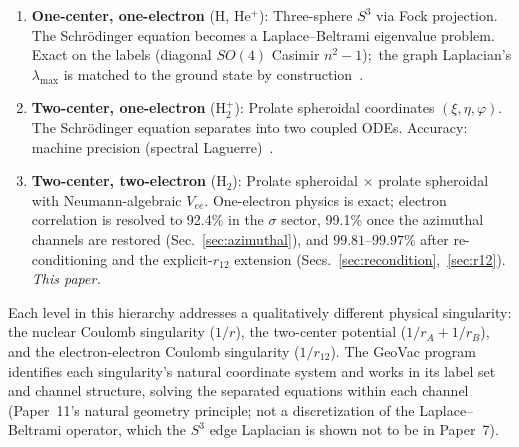 \documentclass[aps,pra,twocolumn,superscriptaddress,longbibliography]{revtex4-2}
\begin{document}
\begin{enumerate}
  \item \textbf{One-center, one-electron} (H, He$^+$):
    Three-sphere $S^3$ via Fock projection.  The Schr\"odinger
    equation becomes a Laplace--Beltrami eigenvalue problem.
    Exact on the labels (diagonal $SO(4)$ Casimir $n^2-1$);\ the graph
    Laplacian's $\lambda_{\max}$ is matched to the ground state by
    construction~\cite{loutey_paper0, loutey_paper1}.
  \item \textbf{Two-center, one-electron} (H$_2^+$):
    Prolate spheroidal coordinates $(\xi, \eta, \varphi)$.
    The Schr\"odinger equation separates into two coupled ODEs.
    Accuracy: machine precision (spectral Laguerre)~\cite{loutey_paper11}.
  \item \textbf{Two-center, two-electron} (H$_2$):
    Prolate spheroidal $\times$ prolate spheroidal with
    Neumann-algebraic $V_{ee}$.  One-electron physics is
    exact; electron correlation is resolved to 92.4\% in the
    $\sigma$ sector, 99.1\% once the azimuthal channels are
    restored (Sec.~\ref{sec:azimuthal}), and $99.81$--$99.97\%$ after
    re-conditioning and the explicit-$r_{12}$ extension
    (Secs.~\ref{sec:recondition},~\ref{sec:r12}).  \emph{This paper.}
\end{enumerate}

Each level in this hierarchy addresses a qualitatively different
physical singularity: the nuclear Coulomb singularity ($1/r$),
the two-center potential ($1/r_A + 1/r_B$), and the
electron-electron Coulomb singularity ($1/r_{12}$).  The GeoVac
program identifies each singularity's natural coordinate system and
works in its label set and channel structure, solving the separated
equations within each channel (Paper~11's natural geometry
principle; not a discretization of the Laplace--Beltrami operator,
which the $S^3$ edge Laplacian is shown not to be in Paper~7).
\end{document}
